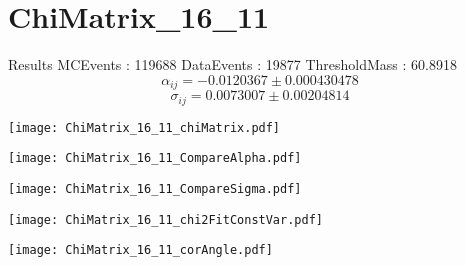 \documentclass[a4paper,12pt]{article}
\begin{document}
\section{ChiMatrix\_16\_11}
\begin{minipage}{0.49\linewidth} Results \newline
MCEvents : 119688\newline
DataEvents : 19877 \newline
ThresholdMass : 60.8918\\
$$\alpha_{ij} = -0.0120367\pm 0.000430478$$
$$\sigma_{ij} = 0.0073007\pm 0.00204814$$
\end{minipage}\hfill
\begin{minipage}{0.49\linewidth} 
\texttt{[image: ChiMatrix\_16\_11\_chiMatrix.pdf]}\\
\end{minipage}
\hfill
\begin{minipage}{0.49\linewidth} 
\texttt{[image: ChiMatrix\_16\_11\_CompareAlpha.pdf]}\\
\end{minipage}
\hfill
\begin{minipage}{0.49\linewidth} 
\texttt{[image: ChiMatrix\_16\_11\_CompareSigma.pdf]}\\
\end{minipage}
\begin{minipage}{0.49\linewidth} 
\texttt{[image: ChiMatrix\_16\_11\_chi2FitConstVar.pdf]}\\
\end{minipage}
\hfill
\begin{minipage}{0.49\linewidth} 
\texttt{[image: ChiMatrix\_16\_11\_corAngle.pdf]}\\
\end{minipage}
\end{document}
